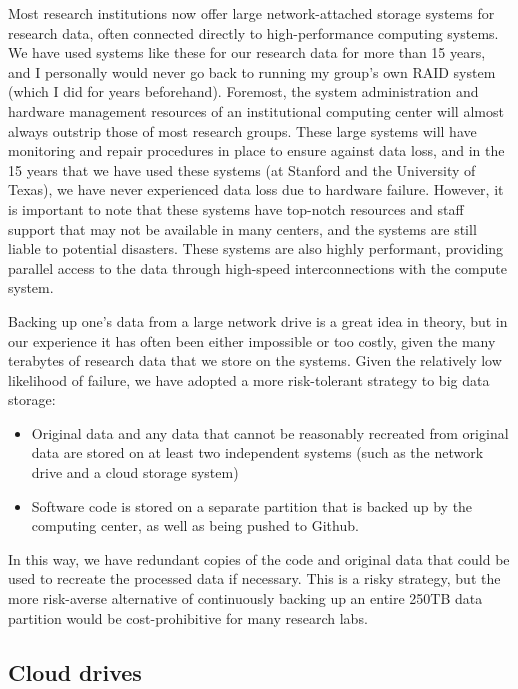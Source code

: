 Most research institutions now offer large network-attached storage systems for research data, often connected directly to high-performance computing systems.  We have used systems like these for our research data for more than 15 years, and I personally would never go back to running my group's own RAID system (which I did for years beforehand).  Foremost, the system administration and hardware management resources of an institutional computing center will almost always outstrip those of most research groups.  These large systems will have monitoring and repair procedures in place to ensure against data loss, and in the 15 years that we have used these systems (at Stanford and the University of Texas), we have never experienced data loss due to hardware failure. However, it is important to note that these systems have top-notch resources and staff support that may not be available in many centers, and the systems are still liable to potential disasters.  These systems are also highly performant, providing parallel access to the data through high-speed interconnections with the compute system.

Backing up one's data from a large network drive is a great idea in theory, but in our experience it has often been either impossible or too costly, given the many terabytes of research data that we store on the systems.  Given the relatively low likelihood of failure, we have adopted a more risk-tolerant strategy to big data storage:

\begin{itemize}
\item Original data and any data that cannot be reasonably recreated from original data are stored on at least two independent systems (such as the network drive and a cloud storage system)
\item Software code is stored on a separate partition that is backed up by the computing center, as well as being pushed to Github.
\end{itemize}

In this way, we have redundant copies of the code and original data that could be used to recreate the processed data if necessary.  This is a risky strategy, but the more risk-averse alternative of continuously backing up an entire 250TB data partition would be cost-prohibitive for many research labs.

\subsection{Cloud drives}

